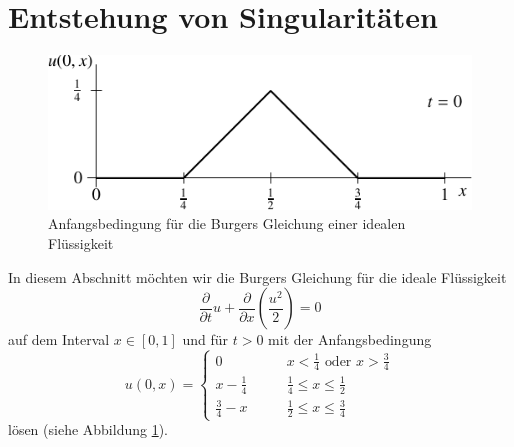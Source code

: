 %
%
%
\section{Entstehung von Singularitäten\label{burgersunstetig}}
\begin{figure}
\begin{center}
\includegraphics[width=0.8\hsize]{../common/images/burgers-1}
\end{center}
\caption{Anfangsbedingung für die Burgers Gleichung einer idealen
Flüssigkeit\label{burgersanfang}}
\end{figure}
In diesem Abschnitt möchten wir die Burgers Gleichung für die ideale
Flüssigkeit
\[
\frac{\partial}{\partial t}u+\frac{\partial}{\partial x}\left(\frac{u^2}2\right)=0
\]
auf dem Interval $x\in[0,1]$ und für $t>0$
mit der Anfangsbedingung
\[
u(0,x)=\begin{cases}
0\qquad&\text{$x<\frac14$ oder $x>\frac34$}\\
x-\frac14\qquad&\frac14\le x\le \frac12\\
\frac34-x\qquad&\frac12\le x\le \frac34
\end{cases}
\]
lösen (siehe Abbildung \ref{burgersanfang}).

